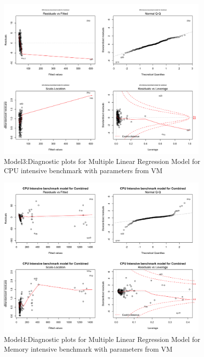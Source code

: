 \documentclass[a4paper,10pt,twoside]{article}
\begin{document}
\begin{figure}[h]
\centering
\includegraphics[width=400px]{combined_cpu_intensive_benchmark.png} 
\caption{Model3:Diagnostic plots for Multiple Linear Regression Model for CPU intensive benchmark with parameters from VM}
\end{figure}
\begin{figure}[h]
\centering
\includegraphics[width=400px]{combined_model_memory_intensive_benchmkark.png} 
\caption{Model4:Diagnostic plots for  Multiple Linear Regression Model for Memory intensive benchmark with parameters from VM}
\end{figure}
\end{document}
